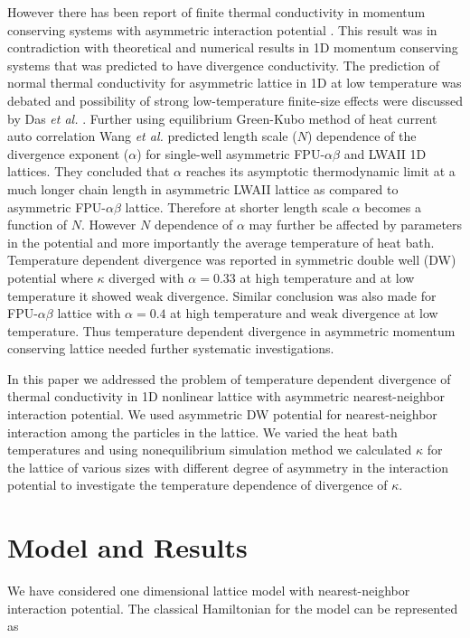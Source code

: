 \documentclass[aps,pre,reprint,groupedaddress]{revtex4-1}
\begin{document}
However there has been report of finite thermal conductivity in momentum conserving systems with asymmetric interaction potential \cite{Zhong2012a}. This result was in contradiction with theoretical and numerical results in 1D momentum conserving systems that was predicted to have divergence conductivity. The prediction of normal thermal conductivity for asymmetric lattice in 1D at low temperature was debated and possibility of strong low-temperature finite-size effects were discussed by Das \textit{et al.} \cite{Das2014}. Further using equilibrium Green-Kubo method of heat current auto correlation Wang \textit{et al.} \cite{Wang2013} predicted length scale ($N$) dependence of the divergence exponent ($\alpha$) for single-well asymmetric FPU-$\alpha\beta$ and LWAII \cite{Zhong2012a} 1D lattices. They concluded that $\alpha$ reaches its asymptotic thermodynamic limit at a much longer chain length in asymmetric LWAII lattice as compared to asymmetric FPU-$\alpha\beta$ lattice. Therefore at shorter length scale $\alpha$ becomes a function of $N$. However $N$ dependence of $\alpha$ may further be affected by parameters in the potential and more importantly the average temperature of heat bath. Temperature dependent divergence was reported in symmetric double well (DW) potential where $\kappa$ diverged with $\alpha=0.33$ at high temperature and at low temperature it showed weak divergence\cite{Roy2012a}. Similar conclusion was also made for FPU-$\alpha\beta$ lattice with $\alpha=0.4$ at high temperature and weak divergence at low temperature\cite{Savin2014}. Thus temperature dependent divergence in asymmetric momentum conserving lattice needed further systematic investigations. 

In this paper we addressed the problem of temperature dependent divergence of thermal conductivity in 1D nonlinear lattice with asymmetric nearest-neighbor interaction potential. We used asymmetric DW potential for nearest-neighbor interaction among the particles in the lattice. We varied the heat bath temperatures and using nonequilibrium simulation method we calculated $\kappa$ for the lattice of various sizes with different degree of asymmetry in the interaction potential to investigate the temperature dependence of divergence of $\kappa$.   

\section{Model and Results}
We have considered one dimensional lattice model with nearest-neighbor interaction potential. The classical Hamiltonian for the model can be represented as
\end{document}
